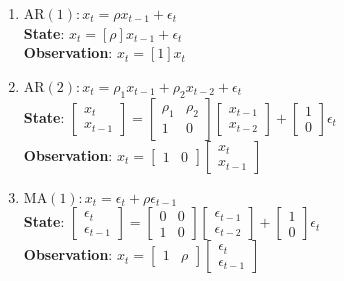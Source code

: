 \documentclass{article}
\begin{document}
	\begin{enumerate}
		\item $\text{AR}(1): x_t = \rho x_{t-1} + \epsilon_t$ \\
			\textbf{State}: \hspace{4mm} $x_t = [\rho]x_{t-1} + \epsilon_t$ \\
			\textbf{Observation}: $ x_t = [1]x_t$
		\item $\text{AR}(2): x_t = \rho_1 x_{t-1} + \rho_2 x_{t-2} + \epsilon_t$\\
			\textbf{State}: \hspace{4mm} $\begin{bmatrix} x_t \\ x_{t-1} \end{bmatrix} = \begin{bmatrix} \rho_1 & \rho_2 \\ 1 & 0\end{bmatrix}\begin{bmatrix} x_{t-1} \\ x_{t-2} \end{bmatrix} + \begin{bmatrix} 1 \\ 0 \end{bmatrix} \epsilon_t $ \\
			\textbf{Observation}: $ x_t = \begin{bmatrix} 1 & 0\end{bmatrix} \begin{bmatrix}x_t \\ x_{t-1}\end{bmatrix}$

		\item $\text{MA}(1): x_t = \epsilon_t + \rho \epsilon_{t-1}$\\

			\textbf{State}: \hspace{4mm} $\begin{bmatrix} \epsilon_t \\ \epsilon_{t-1} \end{bmatrix} = \begin{bmatrix} 0 & 0 \\ 1 & 0 \end{bmatrix}
\begin{bmatrix} \epsilon_{t-1} \\ \epsilon_{t-2} \end{bmatrix} + \begin{bmatrix} 1 \\ 0 \end{bmatrix} \epsilon_t $ \\
			\textbf{Observation}: $ x_t = \begin{bmatrix} 1 & \rho \end{bmatrix} \begin{bmatrix}\epsilon_t \\ \epsilon_{t-1}\end{bmatrix}$


\end{enumerate}
\end{document}
